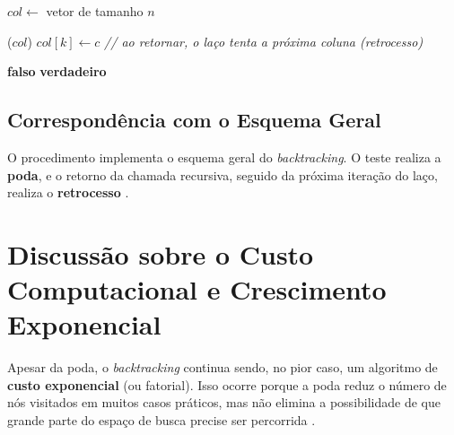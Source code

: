 \begin{algorithm}[htb]
\caption{\label{alg:nrainhas}Problema das $n$ rainhas por \textit{backtracking}.}
\begin{algorithmic}[1]
    \State $col \gets$ vetor de tamanho $n$
    \State {}
\EndProcedure
\Statex

        \State {}($col$) 
        \State \Return
    \EndIf
         
            \State $col[k] \gets c$ 
            \State {} 
            \Statex \hspace{\algorithmicindent}\hspace{\algorithmicindent}\textit{// ao retornar, o laço tenta a próxima coluna (retrocesso)}
        \EndIf
    \EndFor
\EndProcedure
\Statex

            \State \Return \textbf{falso}
        \EndIf
    \EndFor
    \State \Return \textbf{verdadeiro}
\EndFunction
\end{algorithmic}
\end{algorithm}

\subsection{Correspondência com o Esquema Geral}

O procedimento  implementa o esquema geral do \textit{backtracking}. O teste  realiza a \textbf{poda}, e o retorno da chamada recursiva, seguido da próxima iteração do laço, realiza o \textbf{retrocesso} \cite{ziviani2007, feofiloff2009}.

\section{Discussão sobre o Custo Computacional e Crescimento Exponencial}

Apesar da poda, o \textit{backtracking} continua sendo, no pior caso, um algoritmo de \textbf{custo exponencial} (ou fatorial). Isso ocorre porque a poda reduz o número de nós visitados em muitos casos práticos, mas não elimina a possibilidade de que grande parte do espaço de busca precise ser percorrida \cite{cormen2012, toscani2012}.

